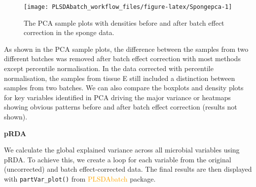 \documentclass[
]{book}
\begin{document}
\begin{figure}

{\centering \texttt{[image: PLSDAbatch\_workflow\_files/figure-latex/Spongepca-1]} 

}

\caption{The PCA sample plots with densities before and after batch effect correction in the sponge data.}\label{fig:Spongepca}
\end{figure}

As shown in the PCA sample plots, the difference between the samples from two different batches was removed after batch effect correction with most methods except percentile normalisation. In the data corrected with percentile normalisation, the samples from tissue E still included a distinction between samples from two batches. We can also compare the boxplots and density plots for key variables identified in PCA driving the major variance or heatmaps showing obvious patterns before and after batch effect correction (results not shown).

\textbf{pRDA}

We calculate the global explained variance across all microbial variables using pRDA. To achieve this, we create a loop for each variable from the original (uncorrected) and batch effect-corrected data. The final results are then displayed with \texttt{partVar\_plot()} from \textcolor{orange}{PLSDAbatch} package.
\end{document}

